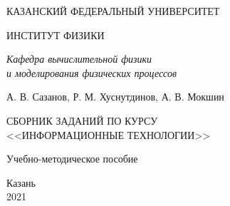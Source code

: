 \begin{titlingpage}
    \centering
    КАЗАНСКИЙ ФЕДЕРАЛЬНЫЙ УНИВЕРСИТЕТ
    
    \medskip
    
    ИНСТИТУТ ФИЗИКИ
    
    \medskip
    
    \textit{Кафедра вычислительной физики \\
    и моделирования физических процессов}
    
    \vfill
    
    А. В. Сазанов, Р. М. Хуснутдинов, А. В. Мокшин
    
    \vspace{2cm}
    
    {\LARGE СБОРНИК ЗАДАНИЙ ПО КУРСУ\\
    \bigskip <<ИНФОРМАЦИОННЫЕ ТЕХНОЛОГИИ>>}
    
    \vspace{2cm}
    
    Учебно-методическое пособие
    
    \vfill
    
    Казань\\
    2021
    
    \end{titlingpage}
    